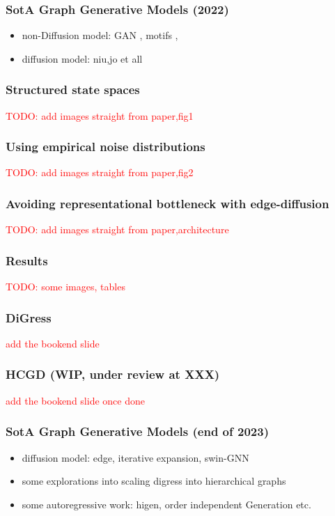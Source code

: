 \documentclass[./presentation.tex]{subfiles}
\begin{document}
\begin{frame}[label=working]
  \frametitle{SotA Graph Generative Models (2022)}
  \begin{itemize}
    \item non-Diffusion model: GAN \cite{martinkusSPECTRESpectralConditioning2022b}, motifs \cite{maziarzLearningExtendMolecular2021},\cite{luoGraphDFDiscreteFlow2021d}
    \item diffusion model: niu,jo et all
  \end{itemize}
\end{frame}
\begin{frame}[label=working]
  \frametitle{Structured state spaces}
  \textcolor{red}{TODO: add images straight from paper,fig1}
\end{frame}

\begin{frame}[label=working]
  \frametitle{Using empirical noise distributions}
  \textcolor{red}{TODO: add images straight from paper,fig2}
\end{frame}
\begin{frame}[label=working]
  \frametitle{Avoiding representational bottleneck with edge-diffusion}
  \textcolor{red}{TODO: add images straight from paper,architecture}
\end{frame}
\begin{frame}[label=working]
  \frametitle{Results}
  \textcolor{red}{TODO: some images, tables}
\end{frame}
\begin{frame}[t]
  \frametitle{DiGress \cite{vignacDiGressDiscreteDenoising2023b}}
  \textcolor{red}{add the bookend slide }
\end{frame}
\begin{frame}[t]
  \frametitle{HCGD (WIP, under review at XXX)}

  \textcolor{red}{add the bookend slide once done}
\end{frame}
\begin{frame}[label=working]
  \frametitle{SotA Graph Generative Models (end of 2023)}
  \begin{itemize}
    \item diffusion model: edge, iterative expansion, swin-GNN
    \item some explorations into scaling digress into hierarchical graphs
    \item some autoregressive work: higen, order independent Generation etc.
  \end{itemize}
\end{frame}
\end{document}
